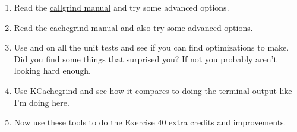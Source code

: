 \begin{enumerate}
\item Read the \href{http://valgrind.org/docs/manual/cl-manual.html}{callgrind manual} 
    and try some advanced options.
\item Read the \href{http://valgrind.org/docs/manual/cg-manual.html}{cachegrind manual}
    and also try some advanced options.
\item Use  and  on all the unit tests and
    see if you can find optimizations to make.  Did you find some things that
    surprised you?  If not you probably aren't looking hard enough.
\item Use KCachegrind and see how it compares to doing the terminal output like
    I'm doing here.
\item Now use these tools to do the Exercise 40 extra credits and improvements.
\end{enumerate}


